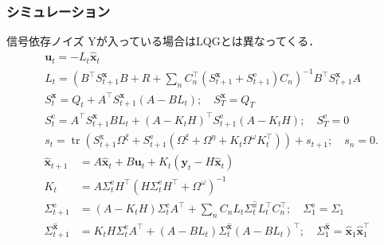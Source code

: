 \subsubsection{シミュレーション}
信号依存ノイズ Yが入っている場合はLQGとは異なってくる．
\begin{align}
&\mathbf{u}_{t}=-L_{t} \hat{\mathbf{x}}_{t} \\
&L_{t}=\left(B^\top S_{t+1}^{\mathbf{x}} B+R+\sum_{n} C_{n}^\top\left(S_{t+1}^{\mathbf{x}}+S_{t+1}^{\mathrm{e}}\right) C_{n}\right)^{-1} B^\top S_{t+1}^{\mathbf{x}} A \\
&S_{t}^{\mathbf{x}}=Q_{t}+A^\top S_{t+1}^{\mathbf{x}}\left(A-B L_{t}\right) ; \quad S_{T}^{\mathbf{x}}=Q_{T} \\
&S_{t}^{\mathrm{e}}=A^\top S_{t+1}^{\mathbf{x}} B L_t+\left(A-K_{t} H\right)^\top S_{t+1}^{\mathrm{e}}\left(A-K_{t} H\right) ; \quad S_{T}^{\mathrm{e}}=0\\
&s_{t}=\operatorname{tr}\left(S_{t+1}^{\mathrm{x}}\Omega^{\xi}+S_{t+1}^{\mathrm{e}}\left(\Omega^{\xi}+\Omega^{\eta}+K_{t} \Omega^{\omega} K_{t}^{\top}\right)\right)+s_{t+1} ; \quad s_{n}=0 .
\end{align}
\begin{align}
\hat{\mathbf{x}}_{t+1} &=A \hat{\mathbf{x}}_{t}+B \mathbf{u}_{t}+K_{t}\left(\mathbf{y}_{t}-H \hat{\mathbf{x}}_{t}\right) \\
K_{t} &=A \Sigma_{t}^{\mathrm{e}} H^\top\left(H \Sigma_{t}^{\mathrm{e}} H^\top+\Omega^{\omega}\right)^{-1} \\
\Sigma_{t+1}^{\mathrm{e}} &=\left(A-K_{t} H\right) \Sigma_{t}^{\mathrm{e}} A^\top+\sum_{n} C_{n} L_{t} \Sigma_{t}^{\hat{x}} L_{t}^\top C_{n}^\top ; \quad \Sigma_{1}^{\mathrm{e}}=\Sigma_{1} \\
\Sigma_{t+1}^{\hat{\mathbf{x}}} &=K_{t} H \Sigma_{t}^{\mathrm{e}} A^\top+\left(A-B L_{t}\right) \Sigma_{t}^{\hat{\mathbf{x}}}\left(A-B L_{t}\right)^\top ; \quad \Sigma_{1}^{\hat{\mathbf{x}}}=\hat{\mathbf{x}}_{1} \hat{\mathbf{x}}_{1}^\top
\end{align}
